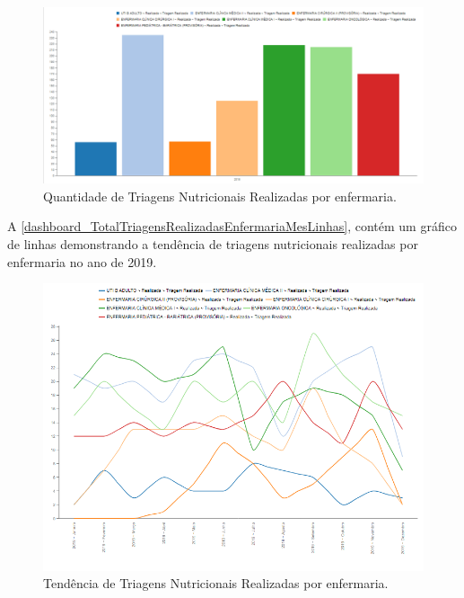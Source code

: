 \newpage
\begin{figure}[htb]
	\caption{\label{dashboard_TotalTriagensRealizadasEnfermariaAnoBarras}Quantidade de Triagens Nutricionais Realizadas por enfermaria.}
	\begin{center}
	    \includegraphics[scale=0.4]{Imagens/1.3.TotalTriagensRealizadasEnfermariaAnoBarras.png}
	\end{center}
\end{figure}

A \autoref{dashboard_TotalTriagensRealizadasEnfermariaMesLinhas}, contém um gráfico de linhas demonstrando a tendência de triagens nutricionais realizadas por enfermaria no ano de 2019.

\begin{figure}[htb]
	\caption{\label{dashboard_TotalTriagensRealizadasEnfermariaMesLinhas}Tendência de Triagens Nutricionais Realizadas por enfermaria.}
	\begin{center}
	    \includegraphics[scale=0.63]{Imagens/1.4.TotalTriagensRealizadasEnfermariaMesLinhas.png}
	\end{center}
\end{figure}

